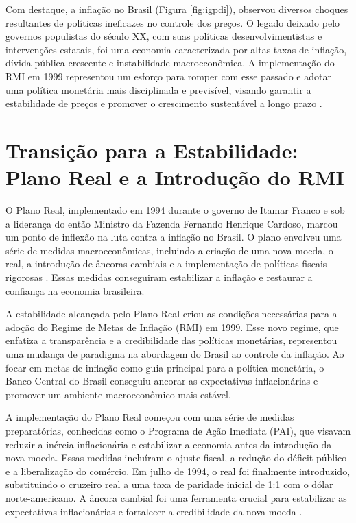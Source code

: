 \documentclass[12pt,oneside,a4paper,chapter=TITLE,english,brazil,sumario=abnt-6027-2012]{abntex2}
\begin{document}
Com destaque, a inflação no Brasil (Figura \ref{fig:igpdi}), observou diversos choques resultantes de políticas ineficazes no controle dos preços. O legado deixado pelo governos populistas do século XX, com suas políticas desenvolvimentistas e intervenções estatais, foi uma economia caracterizada por altas taxas de inflação, dívida pública crescente e instabilidade macroeconômica. A implementação do RMI em 1999 representou um esforço para romper com esse passado e adotar uma política monetária mais disciplinada e previsível, visando garantir a estabilidade de preços e promover o crescimento sustentável a longo prazo \cite{amaurypatrickgremaud_2009_economia}.

\section{Transição para a Estabilidade: Plano Real e a Introdução do RMI}

O Plano Real, implementado em 1994 durante o governo de Itamar Franco e sob a liderança do então Ministro da Fazenda Fernando Henrique Cardoso, marcou um ponto de inflexão na luta contra a inflação no Brasil. O plano envolveu uma série de medidas macroeconômicas, incluindo a criação de uma nova moeda, o real, a introdução de âncoras cambiais e a implementação de políticas fiscais rigorosas \cite{amaurypatrickgremaud_2009_economia}. Essas medidas conseguiram estabilizar a inflação e restaurar a confiança na economia brasileira.

A estabilidade alcançada pelo Plano Real criou as condições necessárias para a adoção do Regime de Metas de Inflação (RMI) em 1999. Esse novo regime, que enfatiza a transparência e a credibilidade das políticas monetárias, representou uma mudança de paradigma na abordagem do Brasil ao controle da inflação. Ao focar em metas de inflação como guia principal para a política monetária, o Banco Central do Brasil conseguiu ancorar as expectativas inflacionárias e promover um ambiente macroeconômico mais estável.

A implementação do Plano Real começou com uma série de medidas preparatórias, conhecidas como o Programa de Ação Imediata (PAI), que visavam reduzir a inércia inflacionária e estabilizar a economia antes da introdução da nova moeda. Essas medidas incluíram o ajuste fiscal, a redução do déficit público e a liberalização do comércio. Em julho de 1994, o real foi finalmente introduzido, substituindo o cruzeiro real a uma taxa de paridade inicial de 1:1 com o dólar norte-americano. A âncora cambial foi uma ferramenta crucial para estabilizar as expectativas inflacionárias e fortalecer a credibilidade da nova moeda \cite{silva_2002_plano}. 
\end{document}
